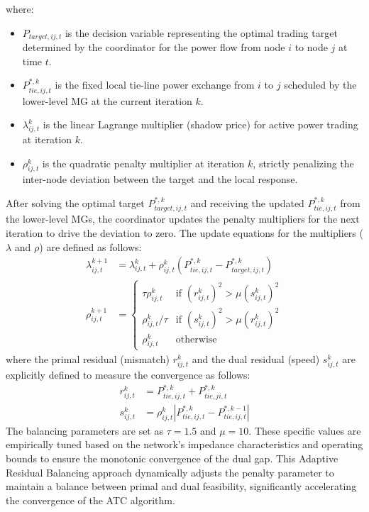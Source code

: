 where:
\begin{itemize}
    \item $P_{target,ij,t}$ is the decision variable representing the optimal trading target determined by the coordinator for the power flow from node $i$ to node $j$ at time $t$.
    \item $P_{tie,ij,t}^{*,k}$ is the fixed local tie-line power exchange from $i$ to $j$ scheduled by the lower-level MG at the current iteration $k$.
    \item $\lambda_{ij,t}^k$ is the linear Lagrange multiplier (shadow price) for active power trading at iteration $k$.
    \item $\rho_{ij,t}^k$ is the quadratic penalty multiplier at iteration $k$, strictly penalizing the inter-node deviation between the target and the local response.
\end{itemize}

After solving the optimal target $P_{target,ij,t}^{*, k}$ and receiving the updated $P_{tie,ij,t}^{*, k}$ from the lower-level MGs, the coordinator updates the penalty multipliers for the next iteration to drive the deviation to zero. The update equations for the multipliers ($\lambda$ and $\rho$) are defined as follows:
\begin{subequations} \label{eq:ATC_multiplier_updates}
\begin{align}
    \lambda_{ij,t}^{k+1} &= \lambda_{ij,t}^k + \rho_{ij,t}^k \left( P_{tie,ij,t}^{*, k} - P_{target,ij,t}^{*, k} \right) \label{eq:ATC_lambda_update} \\
    \rho_{ij,t}^{k+1} &= 
    \begin{cases} 
      \tau \rho_{ij,t}^k & \text{if } (r_{ij,t}^k)^2 > \mu (s_{ij,t}^k)^2 \\
      \rho_{ij,t}^k / \tau & \text{if } (s_{ij,t}^k)^2 > \mu (r_{ij,t}^k)^2 \\
      \rho_{ij,t}^k & \text{otherwise}
    \end{cases} \label{eq:ATC_rho_update}
\end{align}
\end{subequations}
where the primal residual (mismatch) $r_{ij,t}^k$ and the dual residual (speed) $s_{ij,t}^k$ are explicitly defined to measure the convergence as follows:
\begin{subequations} \label{eq:ATC_residuals}
\begin{align}
    r_{ij,t}^k &= P_{tie,ij,t}^{*,k} + P_{tie,ji,t}^{*,k} \label{eq:ATC_primal_residual} \\
    s_{ij,t}^k &= \rho_{ij,t}^k \left| P_{tie,ij,t}^{*,k} - P_{tie,ij,t}^{*,k-1} \right| \label{eq:ATC_dual_residual}
\end{align}
\end{subequations}
The balancing parameters are set as $\tau = 1.5$ and $\mu = 10$. These specific values are empirically tuned based on the network's impedance characteristics and operating bounds to ensure the monotonic convergence of the dual gap. This Adaptive Residual Balancing approach dynamically adjusts the penalty parameter to maintain a balance between primal and dual feasibility, significantly accelerating the convergence of the ATC algorithm.

